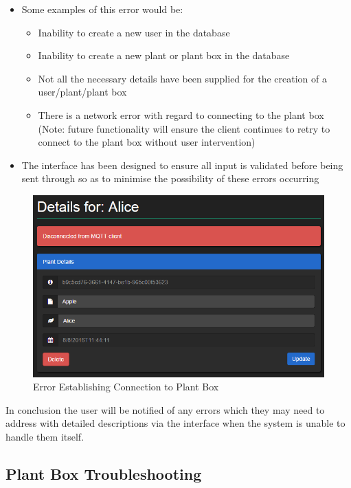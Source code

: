 \documentclass{article}
\begin{document}
\begin{itemize}
\begin{itemize}
				\item Some examples of this error would be:
				\begin{itemize}
					\item Inability to create a new user in the database
					\item Inability to create a new plant or plant box in the database
					\item Not all the necessary details have been supplied for the creation of a user/plant/plant box
					\item There is a network error with regard to connecting to the plant box (Note: future functionality will ensure the client continues to retry to connect to the plant box without user intervention)
				\end{itemize}
				\item The interface has been designed to ensure all input is validated before being sent through so as to minimise the possibility of these errors occurring
			\end{itemize}
			\begin{figure}[H]
				\includegraphics[width=\textwidth]{../images/UserManual/500error.png}
				\caption{Error Establishing Connection to Plant Box}
			\end{figure}
	\end{itemize}

	In conclusion the user will be notified of any errors which they may need to address with detailed descriptions via the interface when the system is unable to handle them itself.
	
	\subsection{Plant Box Troubleshooting}
\end{document}
